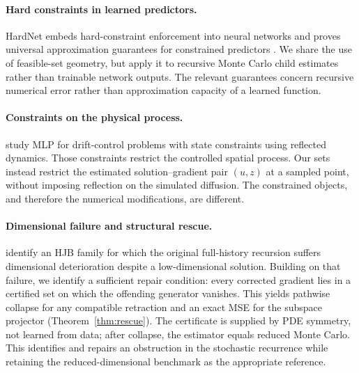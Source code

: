 \documentclass{article}
\begin{document}
\paragraph{Hard constraints in learned predictors.}
HardNet embeds hard-constraint enforcement into neural networks and proves universal approximation guarantees for constrained predictors \citep{MinAzizan2025}. We share the use of feasible-set geometry, but apply it to recursive Monte Carlo child estimates rather than trainable network outputs. The relevant guarantees concern recursive numerical error rather than approximation capacity of a learned function.

\paragraph{Constraints on the physical process.}
\citet{Zhong2025} study MLP for drift-control problems with state constraints using reflected dynamics. Those constraints restrict the controlled spatial process. Our sets instead restrict the estimated solution--gradient pair $(u,z)$ at a sampled point, without imposing reflection on the simulated diffusion. The constrained objects, and therefore the numerical modifications, are different.

\paragraph{Dimensional failure and structural rescue.}
\citet{HutzenthalerNguyen2025} identify an HJB family for which the original full-history recursion suffers dimensional deterioration despite a low-dimensional solution. Building on that failure, we identify a sufficient repair condition: every corrected gradient lies in a certified set on which the offending generator vanishes. This yields pathwise collapse for any compatible retraction and an exact MSE for the subspace projector (Theorem~\ref{thm:rescue}). The certificate is supplied by PDE symmetry, not learned from data; after collapse, the estimator equals reduced Monte Carlo. This identifies and repairs an obstruction in the stochastic recurrence while retaining the reduced-dimensional benchmark as the appropriate reference.
\end{document}
